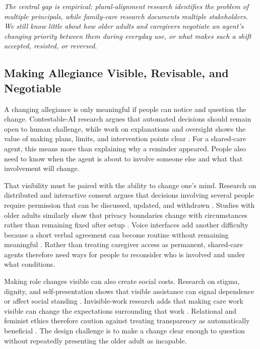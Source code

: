 \textit{The central gap is empirical: plural-alignment research identifies the problem of multiple principals, while family-care research documents multiple stakeholders. We still know little about how older adults and caregivers negotiate an agent's changing priority between them during everyday use, or what makes such a shift accepted, resisted, or reversed.}

\subsection{Making Allegiance Visible, Revisable, and Negotiable}

A changing allegiance is only meaningful if people can notice and question the change. Contestable-AI research argues that automated decisions should remain open to human challenge, while work on explanations and oversight shows the value of making plans, limits, and intervention points clear \cite{6,7,25,28,42,52}. For a shared-care agent, this means more than explaining why a reminder appeared. People also need to know when the agent is about to involve someone else and what that involvement will change.

That visibility must be paired with the ability to change one's mind. Research on distributed and interactive consent argues that decisions involving several people require permission that can be discussed, updated, and withdrawn \cite{71,83,104,109,122}. Studies with older adults similarly show that privacy boundaries change with circumstances rather than remaining fixed after setup \cite{50}. Voice interfaces add another difficulty because a short verbal agreement can become routine without remaining meaningful \cite{100}. Rather than treating caregiver access as permanent, shared-care agents therefore need ways for people to reconsider who is involved and under what conditions.

Making role changes visible can also create social costs. Research on stigma, dignity, and self-presentation shows that visible assistance can signal dependence or affect social standing \cite{17,20,21,34,69}. Invisible-work research adds that making care work visible can change the expectations surrounding that work \cite{85,106}. Relational and feminist ethics therefore caution against treating transparency as automatically beneficial \cite{10,43,44}. The design challenge is to make a change clear enough to question without repeatedly presenting the older adult as incapable.

